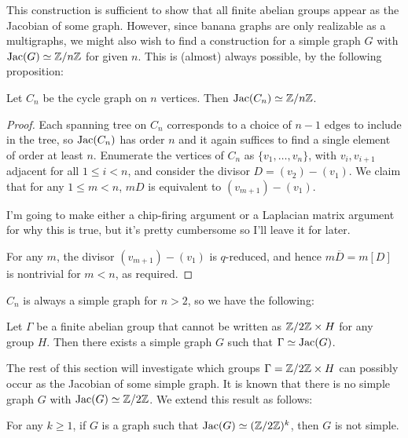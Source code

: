 \documentclass{amsart}
\begin{document}
This construction is sufficient to show that all finite abelian groups
appear as the Jacobian of some graph. However, since banana graphs are
only realizable as a multigraphs, we might also wish to find a
construction for a simple graph $G$ with $\operatorname{Jac}(G) \simeq \mathbb{Z}/n\mathbb{Z}$ for
given $n$. This is (almost) always possible, by the following
proposition:

\begin{prop}
  \label{prop:cycle_cyclic}
  Let $C_n$ be the cycle graph on $n$ vertices. Then $\operatorname{Jac}(C_n) \simeq
  \mathbb{Z}/n\mathbb{Z}$.
\end{prop}

\begin{proof}
  Each spanning tree on $C_n$ corresponds to a choice of $n-1$ edges
  to include in the tree, so $\operatorname{Jac}(C_n)$ has order $n$ and it again
  suffices to find a single element of order at least $n$. Enumerate
  the vertices of $C_n$ as $\{v_1, \ldots, v_n\}$, with $v_i, v_{i+1}$
  adjacent for all $1 \le i < n$, and consider the divisor $D = (v_2)
  - (v_1)$. We claim that for any $1 \le m < n$, $mD$ is equivalent to
  $(v_{m+1}) - (v_1)$.

  I'm going to make either a chip-firing argument or a Laplacian
  matrix argument for why this is true, but it's pretty cumbersome so
  I'll leave it for later.

  For any $m$, the divisor $(v_{m+1}) - (v_1)$ is $q$-reduced, and
  hence $m\overline{D} = m[D]$ is nontrivial for $m < n$, as required.
\end{proof}

$C_n$ is always a simple graph for $n > 2$, so we have the following:

\begin{cor}
  Let $\Gamma$ be a finite abelian group that cannot be written as
  $\mathbb{Z}/2\mathbb{Z} \times H$ for any group $H$. Then there exists a simple
  graph $G$ such that $\Gamma \simeq \operatorname{Jac}(G)$.
\end{cor}

The rest of this section will investigate which groups $\Gamma =
\mathbb{Z}/2\mathbb{Z} \times H$ can possibly occur as the Jacobian of some simple
graph. It is known that there is no simple graph $G$ with $\operatorname{Jac}(G)
\simeq \mathbb{Z}/2\mathbb{Z}$. We extend this result as follows:

\begin{thm}
  \label{thm:2group}
  For any $k \ge 1$, if $G$ is a graph such that $\operatorname{Jac}(G) \simeq
  (\mathbb{Z}/2\mathbb{Z})^k$, then $G$ is not simple.
\end{thm}
\end{document}
